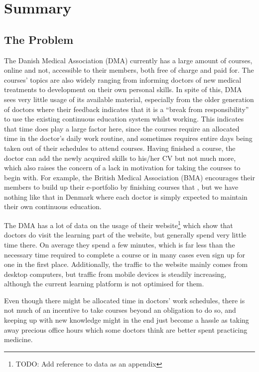\section{Summary}

\subsection{The Problem}
The Danish Medical Association (DMA) currently has a large amount of courses, online and not, accessible to their members, both free of charge and paid for. The courses’ topics are also widely ranging from informing doctors of new medical treatments to development on their own personal skills. In spite of this, DMA sees very little usage of its available material, especially from the older generation of doctors where their feedback indicates that it is a “break from responsibility” to use the existing continuous education system whilst working. This indicates that time does play a large factor here, since the courses require an allocated time in the doctor’s daily work routine, and sometimes requires entire days being taken out of their schedules to attend courses. Having finished a course, the doctor can add the newly acquired skills to his/her CV but not much more, which also raises the concern of a lack in motivation for taking the courses to begin with. For example, the British Medical Association (BMA) encourages their members to build up their e-portfolio by finishing courses that , but we have nothing like that in Denmark where each doctor is simply expected to maintain their own continuous education.

The DMA has a lot of data on the usage of their website\footnote{TODO: Add reference to data as an appendix} which show that doctors do visit the learning part of the website, but generally spend very little time there. On average they spend a few minutes, which is far less than the necessary time required to complete a course or in many cases even sign up for one in the first place. Additionally, the traffic to the website mainly comes from desktop computers, but traffic from mobile devices is steadily increasing, although the current learning platform is not optimised for them.

Even though there might be allocated time in doctors’ work schedules, there is not much of an incentive to take courses beyond an obligation to do so, and keeping up with new knowledge might in the end just become a hassle as taking away precious office hours which some doctors think are better spent practicing medicine.

